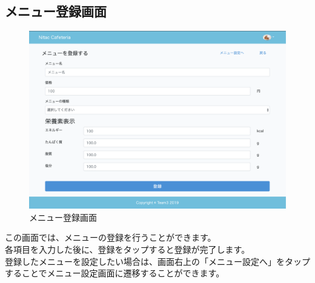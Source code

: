 \documentclass[a4paper]{jsarticle}
\begin{document}
\subsection{メニュー登録画面}
\begin{figure}[htbp]
\centering
	\caption{メニュー登録画面}
	\includegraphics[scale = 0.225]{image/create_menu.png}
\end{figure}
この画面では、メニューの登録を行うことができます。\\
各項目を入力した後に、登録をタップすると登録が完了します。\\
登録したメニューを設定したい場合は、画面右上の「メニュー設定へ」をタップすることでメニュー設定画面に遷移することができます。
\newpage
\end{document}

